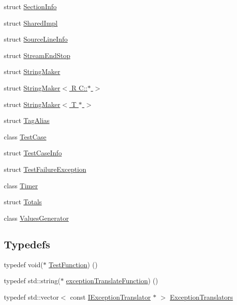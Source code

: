 \begin{DoxyCompactItemize}
\item 
struct \hyperlink{struct_catch_1_1_section_info}{Section\+Info}
\item 
struct \hyperlink{struct_catch_1_1_shared_impl}{Shared\+Impl}
\item 
struct \hyperlink{struct_catch_1_1_source_line_info}{Source\+Line\+Info}
\item 
struct \hyperlink{struct_catch_1_1_stream_end_stop}{Stream\+End\+Stop}
\item 
struct \hyperlink{struct_catch_1_1_string_maker}{String\+Maker}
\item 
struct \hyperlink{struct_catch_1_1_string_maker_3_01_r_01_c_1_1_5_01_4}{String\+Maker$<$ R C\+::$\ast$ $>$}
\item 
struct \hyperlink{struct_catch_1_1_string_maker_3_01_t_01_5_01_4}{String\+Maker$<$ T $\ast$ $>$}
\item 
struct \hyperlink{struct_catch_1_1_tag_alias}{Tag\+Alias}
\item 
class \hyperlink{class_catch_1_1_test_case}{Test\+Case}
\item 
struct \hyperlink{struct_catch_1_1_test_case_info}{Test\+Case\+Info}
\item 
struct \hyperlink{struct_catch_1_1_test_failure_exception}{Test\+Failure\+Exception}
\item 
class \hyperlink{class_catch_1_1_timer}{Timer}
\item 
struct \hyperlink{struct_catch_1_1_totals}{Totals}
\item 
class \hyperlink{class_catch_1_1_values_generator}{Values\+Generator}
\end{DoxyCompactItemize}
\subsection*{Typedefs}
\begin{DoxyCompactItemize}
\item 
typedef void($\ast$ \hyperlink{namespace_catch_a26414f52d0835939fae52aadd27e6257}{Test\+Function}) ()
\item 
typedef std\+::string($\ast$ \hyperlink{namespace_catch_a14edb319150d3e108bbdef994f9eec2a}{exception\+Translate\+Function}) ()
\item 
typedef std\+::vector$<$ const \hyperlink{struct_catch_1_1_i_exception_translator}{I\+Exception\+Translator} $\ast$ $>$ \hyperlink{namespace_catch_ae0442a3627f91437716106138b5f540b}{Exception\+Translators}
\end{DoxyCompactItemize}
